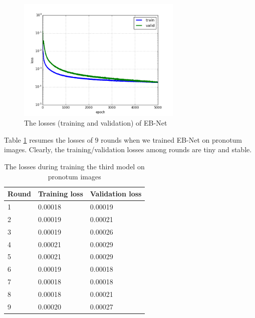\documentclass[review]{elsarticle}
\begin{document}
\begin{figure}[h!]
    \centering
    \includegraphics[width=0.7\textwidth]{images/model3_loss}
    \caption{The losses (training and validation) of EB-Net}
    \label{figloss3}
\end{figure}

Table \ref{tbltrainingloss} resumes the losses of $9$ rounds when we
trained EB-Net on pronotum images. Clearly, the training/validation
losses among rounds are tiny and stable.


\begin{table}[h!]
	\centering
	\begin{tabular}{l l l}
	Round & Training loss & Validation loss \\ \hline
	1 & 0.00018 & 0.00019  \\ \hline
	2 & 0.00019 & 0.00021 \\ \hline
	3 & 0.00019 & 0.00026 \\ \hline
	4 & 0.00021 & 0.00029 \\ \hline
	5 & 0.00021 & 0.00029 \\ \hline
	6 & 0.00019 & 0.00018 \\ \hline
	7 & 0.00018 & 0.00018 \\ \hline
	8 & 0.00018 & 0.00021 \\ \hline
	9 & 0.00020 & 0.00027 \\ \hline
	\end{tabular}
	\caption{\small{The losses during training the third model on pronotum images}}
	\label{tbltrainingloss}
\end{table}
\end{document}
